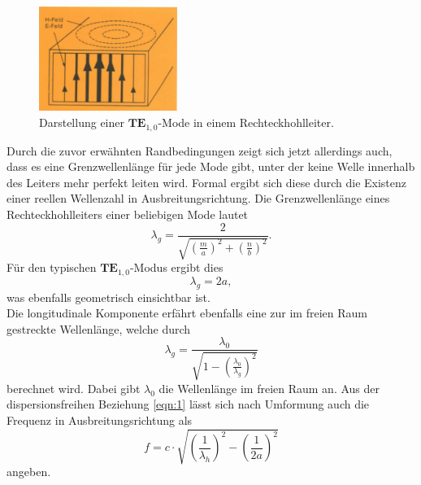 \begin{figure}
    \centering
    \includegraphics[width=0.4\textwidth]{Bilder/mode.png}
    \caption{Darstellung einer $\textbf{TE}_{1,0}$-Mode in einem Rechteckhohlleiter. \cite{skript}} 
    \label{fig:4}
\end{figure}
Durch die zuvor erwähnten Randbedingungen zeigt sich jetzt allerdings auch, dass es eine Grenzwellenlänge für jede Mode gibt, unter der keine Welle innerhalb des Leiters mehr perfekt leiten wird. Formal ergibt sich diese durch die Existenz einer reellen Wellenzahl 
in Ausbreitungsrichtung. 
Die Grenzwellenlänge eines Rechteckhohlleiters einer beliebigen Mode lautet
\begin{equation*}
\lambda_{g} = \frac{2}{\sqrt{\left(\frac{m}{a}\right)^2 + \left(\frac{n}{b}\right)^2}}.
\end{equation*}
Für den typischen $\textbf{TE}_{1,0}$-Modus ergibt dies 
\begin{equation*}
    \lambda_{g} = 2a,
\end{equation*}
was ebenfalls geometrisch einsichtbar ist.
\\
Die longitudinale Komponente erfährt ebenfalls eine zur im freien Raum gestreckte Wellenlänge, welche durch
\begin{equation*}
    \lambda_{g} = \frac{\lambda_0}{\sqrt{1 - \left(\frac{\lambda_0}{\lambda_{g}}\right)^2}}
\end{equation*}
berechnet wird. Dabei gibt $\lambda_0$ die Wellenlänge im freien Raum an. Aus der dispersionsfreihen Beziehung \ref{eqn:1} lässt sich nach Umformung auch die Frequenz in Ausbreitungsrichtung als
\begin{equation}
    \label{eqn:222}
    f = c \cdot \sqrt{\left(\frac{1}{\lambda_h}\right)^2 - \left(\frac{1}{2a}\right)^2}
\end{equation}
angeben.


